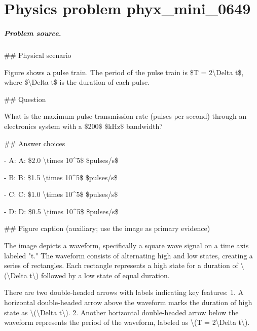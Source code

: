 
\chapter{Physics problem phyx\_mini\_0649}
\label{ch:PhyXMiniProblems_problem_phyx_mini_0649}

\paragraph{Problem source.}
\#\# Physical scenario

Figure shows a pulse train. The period of the pulse train is \$T = 2\textbackslash{}Delta t\$, where \$\textbackslash{}Delta t\$ is the duration of each pulse.

\#\# Question

What is the maximum pulse-transmission rate (pulses per second) through an electronics system with a \$200\$ \$kHz\$ bandwidth?

\#\# Answer choices

- A: A: \$2.0 \textbackslash{}times 10\textasciicircum{}5\$ \$pulses/s\$

- B: B: \$1.5 \textbackslash{}times 10\textasciicircum{}5\$ \$pulses/s\$

- C: C: \$1.0 \textbackslash{}times 10\textasciicircum{}5\$ \$pulses/s\$

- D: D: \$0.5 \textbackslash{}times 10\textasciicircum{}5\$ \$pulses/s\$

\#\# Figure caption (auxiliary; use the image as primary evidence)

The image depicts a waveform, specifically a square wave signal on a time axis labeled "t." The waveform consists of alternating high and low states, creating a series of rectangles. Each rectangle represents a high state for a duration of \textbackslash{}(\textbackslash{}Delta t\textbackslash{}) followed by a low state of equal duration.

There are two double-headed arrows with labels indicating key features:
1. A horizontal double-headed arrow above the waveform marks the duration of high state as \textbackslash{}(\textbackslash{}Delta t\textbackslash{}).
2. Another horizontal double-headed arrow below the waveform represents the period of the waveform, labeled as \textbackslash{}(T = 2\textbackslash{}Delta t\textbackslash{}).

